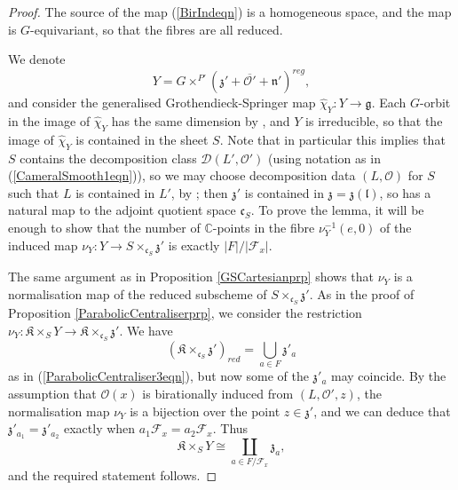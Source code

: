 \documentclass{amsart}
\theoremstyle{remark}
\numberwithin{theorem}{section}
\numberwithin{equation}{section}
\begin{document}
\begin{proof}
The source of the map (\ref{BirIndeqn}) is a homogeneous space, and the map is $G$-equivariant, so that the fibres are all reduced. 

We denote
\begin{equation}\label{BirInd1eqn}
    Y = G \times^{P'}(\mathfrak{z}'+\overline{\mathcal O'}+\mathfrak{n}')^{reg},
\end{equation}
and consider the generalised Grothendieck-Springer map $\hat{\chi}_Y:Y \rightarrow \mathfrak{g}$. Each $G$-orbit in the image of $\hat{\chi}_Y$ has the same dimension by \cite[Satz 3.3]{Borho2}, and $Y$ is irreducible, so that the image of $\hat{\chi}_Y$ is contained in the sheet $S$. Note that in particular this implies that $S$ contains the decomposition class $\mathcal D(L',\mathcal O')$ (using notation as in (\ref{CameralSmooth1eqn})), so we may choose decomposition data $(L,\mathcal O)$ for $S$ such that $L$ is contained in $L'$, by \cite[3.6]{Borho2}; then $\mathfrak{z}'$ is contained in $\mathfrak{z} = \mathfrak{z}(\mathfrak{l})$, so has a natural map to the adjoint quotient space $\mathfrak{c}_S$. To prove the lemma, it will be enough to show that the number of $\mathbb{C}$-points in the fibre $\nu_Y^{-1}(e,0)$ of the induced map $\nu_Y:Y \rightarrow S \times_{\mathfrak{c}_S} \mathfrak{z}'$ is exactly $|F|/|\mathcal F_x|$.

The same argument as in Proposition \ref{GSCartesianprp} shows that $\nu_Y$ is a normalisation map of the reduced subscheme of $S \times_{\mathfrak{c}_S} \mathfrak{z}'$. As in the proof of Proposition \ref{ParabolicCentraliserprp}, we consider the restriction ${\nu}_Y :\mathfrak{K} \times_S Y \rightarrow \mathfrak{K} \times_{\mathfrak{c}_S} \mathfrak{z}'$. We have
\begin{equation}\label{BirInd2eqn}
    ( \mathfrak{K} \times_{\mathfrak{c}_S} \mathfrak{z}')_{red} = \bigcup_{a \in F}\mathfrak{z}'_a
\end{equation}
as in (\ref{ParabolicCentraliser3eqn}), but now some of the $\mathfrak{z}'_a$ may coincide. By the assumption that $\mathcal O(x)$ is birationally induced from $(L,\mathcal O',z)$, the normalisation map ${\nu}_Y$ is a bijection over the point $z \in \mathfrak{z}'$, and we can deduce that $\mathfrak{z}'_{a_1} = \mathfrak{z}'_{a_2}$ exactly when $a_1 \mathcal F_x  = a_2\mathcal F_x$. Thus
\begin{equation}\label{BirInd3eqn}
    \mathfrak{K} \times_S Y\cong \coprod_{a \in F/\mathcal F_x} \mathfrak{z}_a,
\end{equation}
and the required statement follows.
\end{proof}
\end{document}

